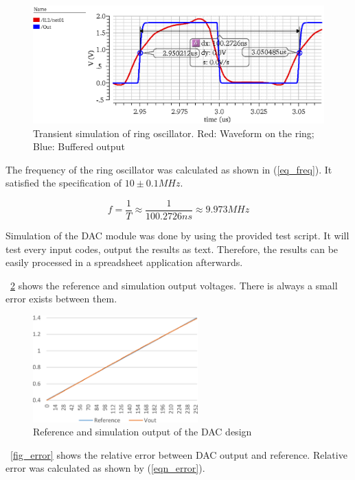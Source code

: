 \documentclass[journal]{IEEEtran}
\newcommand{\fref}[1]{\figurename~\ref{#1}}
\newcommand{\eref}[1]{(\ref{#1})}
\begin{document}
\begin{figure}[!t]
	\centering
	\includegraphics[width=\columnwidth]{sim_osc}
	\caption{Transient simulation of ring oscillator. Red: Waveform on the ring; Blue: Buffered output}
	\label{fig_sim_osc}
\end{figure}

The frequency of the ring oscillator was calculated as shown in \eref{eq_freq}. It satisfied the specification of $10 \pm 0.1 MHz$.

\begin{equation}
	\label{eq_freq}
	f = \frac{1}{T} \approx \frac{1}{100.2726 ns} \approx 9.973 MHz
\end{equation}

Simulation of the DAC module was done by using the provided test script. It will test every input codes, output the results as text. Therefore, the results can be easily processed in a spreadsheet application afterwards.

\fref{fig_output} shows the reference and simulation output voltages. There is always a small error exists between them.

\begin{figure}[!t]
	\centering
	\includegraphics[width=2.5in]{Output}
	\caption{Reference and simulation output of the DAC design}
	\label{fig_output}
\end{figure}

\fref{fig_error} shows the relative error between DAC output and reference. Relative error was calculated as shown by \eref{eqn_error}.
\end{document}
